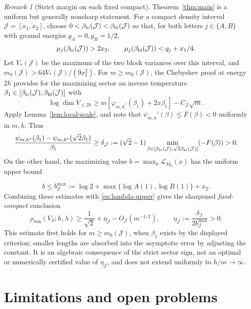 \documentclass[10pt,a4paper]{article}
\numberwithin{equation}{section}
\theoremstyle{remark}\newtheorem{remark}[theorem]{Remark}\newtheorem{question}[theorem]{Question}
\newcommand{\rhow}{\rho_{\mathrm{win}}}\newcommand{\F}{\mathbb F}\newcommand{\K}{\mathbb K}\newcommand{\Z}{\mathbb Z}\newcommand{\R}{\mathbb R}\newcommand{\cB}{\mathcal L}\newcommand{\wt}{\mathrm{wt}}\newcommand{\dimn}{\operatorname{dim}}\newcommand{\supp}{\operatorname{supp}}
\begin{document}
\begin{remark}[Strict margin on each fixed compact]\label{rem:strict}
Theorem~\ref{thm:main} is a uniform but generally nonsharp statement. For a compact density interval $\mathcal J=[x_1,x_2]$, choose $0<\beta_{\rm lo}(\mathcal J)<\beta_{\rm hi}(\mathcal J)$ so that, for both letters $j\in\{A,B\}$ with ground energies $g_A=0,g_B=1/2$,
\[
\mu_j(\beta_{\rm lo}(\mathcal J))>2x_2,\qquad
\mu_j(\beta_{\rm hi}(\mathcal J))<g_j+x_1/4.
\]
Let $V_*(\mathcal J)$ be the maximum of the two block variances over this interval, and $m_0(\mathcal J)>64V_*(\mathcal J)/(9x_1^2)$. For $m\ge m_0(\mathcal J)$, the Chebyshev proof at energy $2h$ provides for the maximizing sector an inverse temperature $\beta_1\in[\beta_{\rm lo}(\mathcal J),\beta_{\rm hi}(\mathcal J)]$ with
\[
\log\dimn V_{\le2h}\ge m[\varphi_{m,k^*}(\beta_1)+2x\beta_1]-C_{\mathcal J}\sqrt m.
\]
Apply Lemma~\ref{lem:local-scale}, and note that $\psi_{m,k}'(\beta)\le F(\beta)<0$ uniformly in $m,k$. Thus
\[
\frac{\psi_{m,k^*}(\beta_1)-\psi_{m,k^*}(\sqrt2\beta_1)}{\beta_1}
\ge\delta_{\mathcal J}:=(\sqrt2-1)\min_{\beta\in[\beta_{\rm lo}(\mathcal J),\sqrt2\beta_{\rm hi}(\mathcal J)]}(-F(\beta))>0.
\]
On the other hand, the maximizing value $b=\max_k\cB_{M_k}(x)$ has the uniform upper bound\par\vspace{-5pt}\[b\le b_{\mathcal J}^{\max}:=\log2+\max\{\log A(1),\log B(1)\}+x_2.\]\vspace{-9pt}Combining these estimates with \eqref{eq:lambda-upper} gives the sharpened \emph{fixed-compact} conclusion
\[
\rhow(V_S;h,\lambda)\ge\frac1{\sqrt2}+\eta_{\mathcal J}-O_{\mathcal J}(m^{-1/2}),\qquad
\eta_{\mathcal J}:=\frac{\delta_{\mathcal J}}{2b_{\mathcal J}^{\max}}>0.
\]
This estimate first holds for $m\ge m_0(\mathcal J)$, when $\beta_1$ exists by the displayed criterion; smaller lengths are absorbed into the asymptotic error by adjusting the constant. It is an algebraic consequence of the strict sector sign, not an optimal or numerically certified value of $\eta_{\mathcal J}$, and does not extend uniformly to $h/m\to\infty$.
\end{remark}

\section{Limitations and open problems}\label{sec:open}
\end{document}
